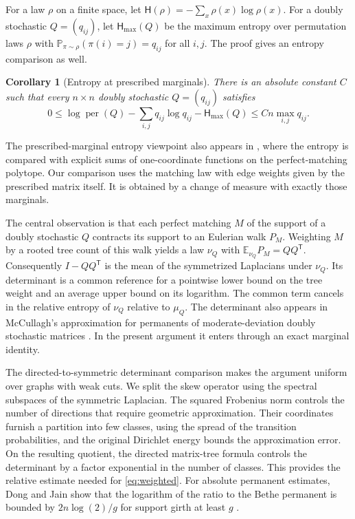 \documentclass[11pt]{article}
\DeclareMathOperator{\per}{per}
\newcommand{\E}{\mathbb{E}}
\newcommand{\PP}{\mathbb{P}}
\newcommand{\Ent}{\mathsf{H}}
\newcommand{\trans}{\mathsf{T}}
\newtheorem{corollary}[theorem]{Corollary}
\begin{document}
For a law \(\rho\) on a finite space, let \(\Ent(\rho)=-\sum_x\rho(x)\log\rho(x)\). For a doubly stochastic \(Q=(q_{ij})\), let \(\Ent_{\max}(Q)\) be the maximum entropy over permutation laws \(\rho\) with \(\PP_{\pi\sim\rho}(\pi(i)=j)=q_{ij}\) for all \(i,j\). The proof gives an entropy comparison as well.

\begin{corollary}[Entropy at prescribed marginals]\label{cor:marginal-entropy}
There is an absolute constant \(C\) such that every \(n\times n\) doubly stochastic \(Q=(q_{ij})\) satisfies
\[
 0\le \log\per(Q)-\sum_{i,j}q_{ij}\log q_{ij}-\Ent_{\max}(Q)
 \le Cn\max_{i,j}q_{ij}.
\]
\end{corollary}

The prescribed-marginal entropy viewpoint also appears in \cite{OpenAIMatching}, where the entropy is compared with explicit sums of one-coordinate functions on the perfect-matching polytope. Our comparison uses the matching law with edge weights given by the prescribed matrix itself. It is obtained by a change of measure with exactly those marginals.

The central observation is that each perfect matching \(M\) of the support of a doubly stochastic \(Q\) contracts its support to an Eulerian walk \(P_M\). Weighting \(M\) by a rooted tree count of this walk yields a law \(\nu_Q\) with \(\E_{\nu_Q}P_M=QQ^{\trans}\). Consequently \(I-QQ^{\trans}\) is the mean of the symmetrized Laplacians under \(\nu_Q\). Its determinant is a common reference for a pointwise lower bound on the tree weight and an average upper bound on its logarithm. The common term cancels in the relative entropy of \(\nu_Q\) relative to \(\mu_Q\). The determinant also appears in McCullagh's approximation for permanents of moderate-deviation doubly stochastic matrices \cite{McCullagh}. In the present argument it enters through an exact marginal identity.

The directed-to-symmetric determinant comparison makes the argument uniform over graphs with weak cuts. We split the skew operator using the spectral subspaces of the symmetric Laplacian. The squared Frobenius norm controls the number of directions that require geometric approximation. Their coordinates furnish a partition into few classes, using the spread of the transition probabilities, and the original Dirichlet energy bounds the approximation error. On the resulting quotient, the directed matrix-tree formula controls the determinant by a factor exponential in the number of classes. This provides the relative estimate needed for \eqref{eq:weighted}. For absolute permanent estimates, Dong and Jain show that the logarithm of the ratio to the Bethe permanent is bounded by \(2n\log(2)/g\) for support girth at least \(g\) \cite{DongJain}.
\end{document}
